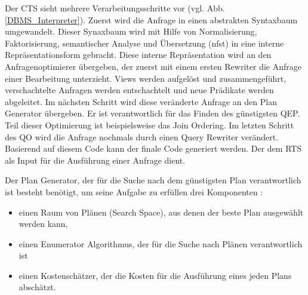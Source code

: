 Der \ac{CTS} sieht mehrere Verarbeitungsschritte vor (vgl. Abb. \ref{DBMS_Interpreter}). Zuerst wird die Anfrage in einen abstrakten Syntaxbaum umgewandelt. Dieser Synaxbaum wird mit Hilfe von Normalisierung, Faktorisierung, semantischer Analyse und Übersetzung (nfst) in eine interne Repräsentationsform gebracht. Diese interne Repräsentation wird an den Anfragenoptimierer übergeben, der zuerst mit einem ersten Rewriter die Anfrage einer Bearbeitung unterzieht. Views werden aufgelöst und zusammengeführt, verschachtelte Anfragen werden entschachtelt und neue Prädikate werden abgeleitet. Im nächsten Schritt wird diese veränderte Anfrage an den Plan Generator übergeben. Er ist verantwortlich für das Finden des günstigsten \ac{QEP}. Teil dieser Optimierung ist beispielsweise das Join Ordering. Im letzten Schritt des \ac{QO} wird die Anfrage nochmals durch einen Query Rewriter verändert. Basierend auf diesem Code kann der finale Code generiert werden. Der dem \ac{RTS} als Input für die Ausführung einer Anfrage dient.


Der Plan Generator, der für die Suche nach dem günstigsten Plan verantwortlich ist besteht benötigt, um seine Aufgabe zu erfüllen drei Komponenten \cite{chaudhuri1998overview}: 

\begin{itemize}
\item einen Raum von Plänen (Search Space), aus denen der beste Plan ausgewählt werden kann,
\item einen Enumerator Algorithmus, der für die Suche nach Plänen verantwortlich ist
\item einen Kostenschätzer, der die Kosten für die Ausführung eines jeden Plans abschätzt.
\end{itemize}
